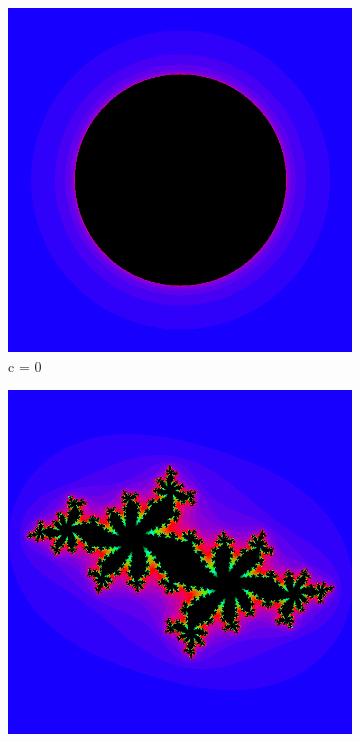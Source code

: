 \documentclass[a4wide, 10pt]{article}
\begin{document}
\begin{figure}[H]
        \centering
        \begin{subfigure}[b]{0.23\textwidth}
                \includegraphics[width=\textwidth]{JuliaSets/julia1.png}
                \caption{c = $0$}
                \label{fig:c=0}
        \end{subfigure}
        \begin{subfigure}[b]{0.23\textwidth}
                \includegraphics[width=\textwidth]{JuliaSets/julia2.png}

\end{subfigure}
\end{figure}
\end{document}
